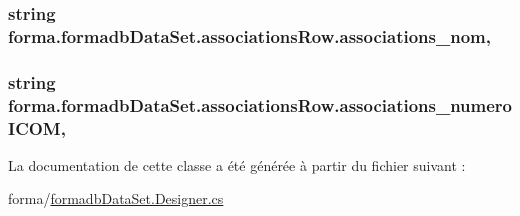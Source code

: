 \subsubsection[{\texorpdfstring{associations\+\_\+nom}{associations_nom}}]{\setlength{\rightskip}{0pt plus 5cm}string forma.\+formadb\+Data\+Set.\+associations\+Row.\+associations\+\_\+nom\hspace{0.3cm}{\ttfamily [get]}, {\ttfamily [set]}}\hypertarget{classforma_1_1formadb_data_set_1_1associations_row_aa2cda58cac686161ac2590cfbe0f12a0}{}\label{classforma_1_1formadb_data_set_1_1associations_row_aa2cda58cac686161ac2590cfbe0f12a0}
\subsubsection[{\texorpdfstring{associations\+\_\+numero\+I\+C\+OM}{associations_numeroICOM}}]{\setlength{\rightskip}{0pt plus 5cm}string forma.\+formadb\+Data\+Set.\+associations\+Row.\+associations\+\_\+numero\+I\+C\+OM\hspace{0.3cm}{\ttfamily [get]}, {\ttfamily [set]}}\hypertarget{classforma_1_1formadb_data_set_1_1associations_row_a0b65b34975301acfb0a04eb09785916f}{}\label{classforma_1_1formadb_data_set_1_1associations_row_a0b65b34975301acfb0a04eb09785916f}


La documentation de cette classe a été générée à partir du fichier suivant \+:\begin{DoxyCompactItemize}
\item 
forma/\hyperlink{formadb_data_set_8_designer_8cs}{formadb\+Data\+Set.\+Designer.\+cs}\end{DoxyCompactItemize}
